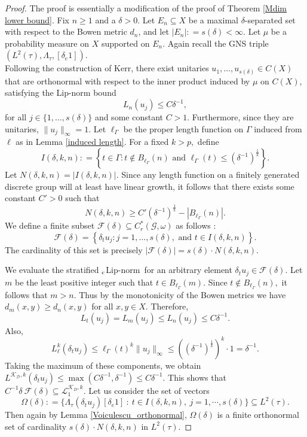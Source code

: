 \documentclass[a4paper,11pt,reqno]{amsart}
\theoremstyle{plain}
\theoremstyle{mainthmstyle}
\theoremstyle{named}
\numberwithin{equation}{section}
\newcommand{\clipnorm}{$_{\text{\rm c}}$Lip-norm}
\begin{document}
\begin{proof}
The proof is essentially a modification of the proof of Theorem \ref{Mdim lower bound}. Fix $n \ge 1$ and a $\delta > 0$. Let $E_n \subseteq X$ be a maximal $\delta$-separated set with respect to the Bowen metric $d_n$, and let $\left \lvert E_n \right \rvert : = s (\delta) < \infty.$ Let $\mu$ be a probability measure on $X$ supported on $E_n.$ Again recall the GNS triple $(L^{2}(\tau),\Lambda_{\tau},[\delta_{e}1])$.\\

Following the construction of Kerr, there exist unitaries $u_1, \dots, u_{s (\delta)} \in C(X)$ that are orthonormal with respect to the inner product induced by $\mu$ on $C(X)$, satisfying the Lip-norm bound
$$L_n(u_j) \leq C \delta^{-1},$$
for all $j \in \{1, \dots, s(\delta)\}$ and some constant $C > 1$. Furthermore, since they are unitaries, $\|u_j\|_{\infty} = 1$. Let $\ell_{\Gamma}$ be the proper length function on $\Gamma$ induced from $\ell$ as in Lemma \ref{induced length}. For a fixed $k > p,$ define
$$I(\delta, k, n) : = \left\{t \in \Gamma : t \notin B_{\ell_{\Gamma}} (n) \text{ and } \ell_{\Gamma} (t) \leq (\delta^{-1})^{\frac{1}{k}} \right\}.$$
Let $N(\delta, k, n) = |I(\delta, k, n)|$. Since any length function on a finitely generated discrete group will at least have linear growth, it follows that there exists some constant $C' > 0$ such that $$N (\delta, k, n) \geq C' \left (\delta^{-1} \right )^{\frac {1} {k}} - \left \lvert B_{\ell_{\Gamma}} (n) \right \rvert.$$ We define a finite subset $\mathcal{F} (\delta) \subseteq C_r^{\ast} (\mathcal G, \omega)$ as follows $:$
$$\mathcal{F} (\delta) = \left\{ \delta_t u_j : j = 1, \dots, s (\delta), \text{ and } t \in I(\delta, k, n) \right\}.$$
The cardinality of this set is precisely $|\mathcal{F} (\delta)| = s (\delta) \cdot N(\delta, k, n)$. 

We evaluate the stratified \clipnorm\ for an arbitrary element $\delta_t u_j \in \mathcal{F} (\delta).$ Let $m$ be the least positive integer such that $t \in B_{\ell_{\Gamma}} (m).$ Since $t \notin B_{\ell_{\Gamma}} (n),$ it follows that $m > n.$ Thus by the monotonicity of the Bowen metrics we have $d_m (x, y) \geq d_n(x, y)$ for all $x, y \in X$. Therefore,
$$L_t (u_j) = L_m (u_j) \leq L_n(u_j) \leq C \delta^{-1}.$$
Also,
$$L_{\ell}^{k}(\delta_t u_j) \leq \ell_{\Gamma} (t)^k \|u_j\|_{\infty} \leq \left( (\delta^{-1})^{\frac{1}{k}} \right)^k \cdot 1 = \delta^{-1}.$$
Taking the maximum of these components, we obtain $L^{\mathcal{K_D}, k}(\delta_t u_j) \leq \max(C\delta^{-1}, \delta^{-1}) \le C \delta^{-1}$. This shows that $C^{-1} \delta\ \mathcal F (\delta) \subseteq \mathcal L^{\mathcal K_D, k}_1.$
Let us consider the set of vectors $$\Omega (\delta) : = \{ \Lambda_\tau(\delta_t u_j)[\delta_e 1]\ :\ t \in I (\delta, k, n),\ j = 1, \cdots, s (\delta) \} \subseteq L^2(\tau).$$ Then again by Lemma \ref{Voiculescu_orthonormal}, $\Omega(\delta)$ is a finite  orthonormal set of cardinality $s (\delta) \cdot N(\delta, k, n)$ in $L^2(\tau).$


\end{proof}
\end{document}
